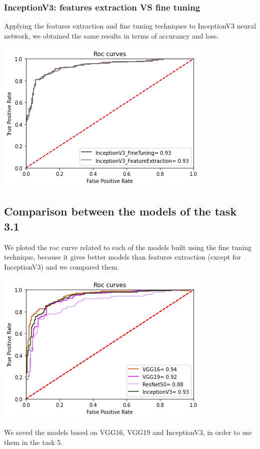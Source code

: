 \documentclass{article}
\begin{document}
\subsubsection{InceptionV3: features extraction VS fine tuning}
Applying the features extraction and fine tuning techniques to InceptionV3 neural network, we obtained the same results in terms of accurancy and loss.
\begin{center}
\begin{minipage}{0.45\textwidth}
        \includegraphics[scale=0.6]{./img/rocInception.png}
    \end{minipage}
\end{center}

\subsection{Comparison between the models of the task 3.1}
We ploted the roc curve related to each of the models built using the fine tuning technique, because it gives better models than features extraction (except for InceptionV3) and we compared them.
\begin{center}
\begin{minipage}{0.45\textwidth}
        \includegraphics[scale=0.6]{./img/rocPretrain1.png}
    \end{minipage}
\end{center}
We saved the models based on VGG16, VGG19 and InceptionV3, in order to use them in the task 5.
\end{document}
